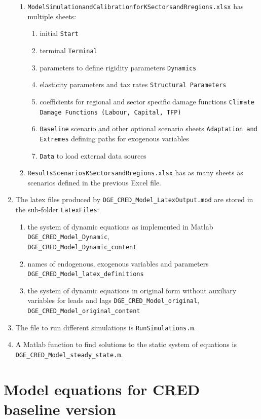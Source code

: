 \documentclass[10pt,a4paper]{article}
\begin{document}
\begin{enumerate}
\begin{enumerate}
\item {\tt ModelSimulationandCalibrationforKSectorsandRregions.xlsx} has multiple sheets:
\begin{enumerate}
\item initial {\tt Start}
\item terminal {\tt Terminal}
\item parameters to define rigidity parameters {\tt Dynamics}
\item elasticity parameters and tax rates {\tt Structural Parameters}
\item coefficients for regional and sector specific damage functions {\tt Climate Damage Functions (Labour, Capital, TFP)}
\item {\tt Baseline} scenario and other optional scenario sheets {\tt Adaptation and Extremes} defining paths for exogenous variables 
\item {\tt Data} to load external data sources
\end{enumerate}
\item {\tt ResultsScenariosKSectorsandRregions.xlsx} has as many sheets as scenarios defined in the previous Excel file.
\end{enumerate}
\item The latex files produced by {\tt DGE_CRED_Model_LatexOutput.mod} are stored in the sub-folder {\tt LatexFiles}:
\begin{enumerate}
\item the system of dynamic equations as implemented in Matlab {\tt DGE_CRED_Model_Dynamic}, \\
 {\tt DGE_CRED_Model_Dynamic_content}
\item names of endogenous, exogenous variables and parameters {\tt DGE_CRED_Model_latex_definitions}
\item the system of dynamic equations in original form without auxiliary variables for leads and lags {\tt DGE_CRED_Model_original}, {\tt DGE_CRED_Model_original_content}
\end{enumerate}
\item The file to run different simulations is {\tt RunSimulations.m}.
\item A Matlab function to find solutions to the static system of equations is {\tt DGE_CRED_Model_steady_state.m}.
\end{enumerate}


\clearpage
\appendix
\section{Model equations for CRED baseline version}\label{app:modelequationsbaseline}
\footnotesize

\end{document}
